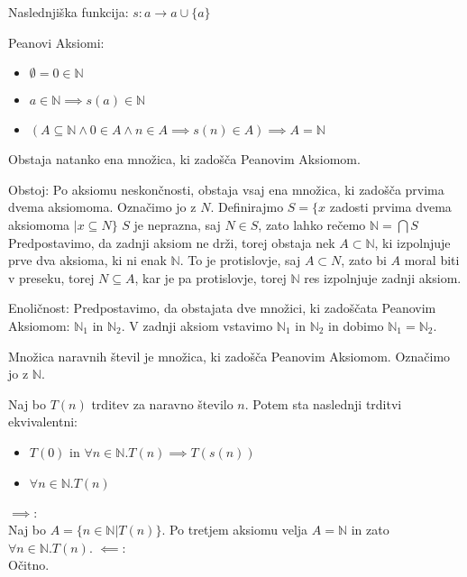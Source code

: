 \begin{definicija}
    Naslednjiška funkcija: $s: a \longrightarrow a \cup \{a\}$

    Peanovi Aksiomi:
    \begin{itemize}
        \item $\emptyset = 0 \in \mathbb{N}$
        \item $a \in \mathbb{N} \implies s(a) \in \mathbb{N}$
        \item $(A \subseteq \mathbb{N} \wedge 0 \in A \wedge n \in A \implies s(n) \in A) \implies A = \mathbb{N}$
    \end{itemize}
\end{definicija}

\begin{trditev}
    Obstaja natanko ena množica, ki zadošča Peanovim Aksiomom.
\end{trditev}
\begin{dokaz}
    Obstoj:
    Po aksiomu neskončnosti, obstaja vsaj ena množica, ki zadošča prvima dvema aksiomoma.
    Označimo jo z $N$.
    Definirajmo $S = \{x$ zadosti prvima dvema aksiomoma $| x \subseteq N\}$
    $S$ je neprazna, saj $N \in S$, zato lahko rečemo $\mathbb{N} = \bigcap S$
    Predpostavimo, da zadnji aksiom ne drži, torej obstaja nek $A \subset \mathbb{N}$, ki izpolnjuje prve dva aksioma, ki ni enak $\mathbb{N}$.
    To je protislovje, saj $A \subset N$, zato bi $A$ moral biti v preseku, torej $N \subseteq A$, kar je pa protislovje, torej $\mathbb{N}$ res izpolnjuje zadnji aksiom.

    Enoličnost:
Predpostavimo, da obstajata dve množici, ki zadoščata Peanovim Aksiomom: $\mathbb{N}_1$ in $\mathbb{N}_2$.
V zadnji aksiom vstavimo $\mathbb{N}_1$ in $\mathbb{N}_2$ in dobimo $\mathbb{N}_1 = \mathbb{N}_2$.
\end{dokaz}

\begin{definicija}
    Množica naravnih števil je množica, ki zadošča Peanovim Aksiomom.
    Označimo jo z $\mathbb{N}$.
\end{definicija}

\begin{trditev}
    Naj bo $T(n)$ trditev za naravno število $n$.
    Potem sta naslednji trditvi ekvivalentni:
    \begin{itemize}
        \item $T(0)$ in $\forall n \in \mathbb{N}. T(n) \implies T(s(n))$
        \item $\forall n \in \mathbb{N}. T(n)$
    \end{itemize}
\end{trditev}
\begin{dokaz}
    $\implies$: \\
    Naj bo $A = \{n \in \mathbb{N} | T(n)\}$.
    Po tretjem aksiomu velja $A = \mathbb{N}$ in zato $\forall n \in \mathbb{N}. T(n)$.
    $\impliedby$: \\
    Očitno.
\end{dokaz}

